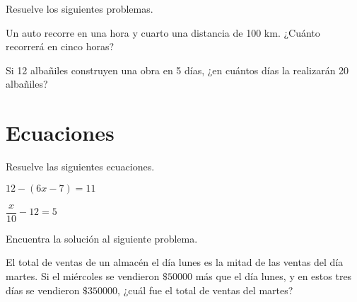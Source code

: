 \documentclass[sin curso]{srs}
\begin{document}
Resuelve los siguientes problemas.
\begin{preguntas}
  \pregunta Un auto recorre en una hora y cuarto una distancia de 100 km. ¿Cuánto recorrerá
  en cinco horas?
  \begin{malla}[height=5cm]
  \end{malla}
  \pregunta Si 12 albañiles construyen una obra en 5 días, ¿en cuántos días la realizarán
  20 albañiles?
  \begin{malla}[height=5cm]
  \end{malla}
\end{preguntas}

\section{Ecuaciones}

Resuelve las siguientes ecuaciones.
\begin{preguntas}
  \pregunta $12-(6x-7)=11$
  \begin{malla}[height=5cm]
  \end{malla}
  \pregunta $\dfrac{x}{10}-12=5$
  \begin{malla}[height=5cm]
  \end{malla}
\end{preguntas}

Encuentra la solución al siguiente problema.

\begin{preguntas}
  \pregunta El total de ventas de un almacén el día lunes es la mitad de las ventas
  del día martes. Si
  el miércoles se vendieron $\$50000$ más que el día lunes, y en estos tres días se vendieron
  $\$350000$, ¿cuál fue el total de ventas del martes?
  \begin{malla}[height=4cm]
  \end{malla}

\end{preguntas}
\end{document}
